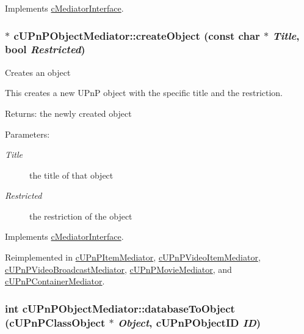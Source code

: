 Implements \hyperlink{classcMediatorInterface_cd087c690154d43ac5ef92c5a42f2349}{cMediatorInterface}.\hypertarget{classcUPnPObjectMediator_bfbca3f1cbadacee2b21306364750f26}{
\subsubsection[{createObject}]{ $\ast$ cUPnPObjectMediator::createObject (const char $\ast$ {\em Title}, \/  bool {\em Restricted})}}
\label{classcUPnPObjectMediator_bfbca3f1cbadacee2b21306364750f26}


Creates an object

This creates a new UPnP object with the specific title and the restriction.

\begin{Desc}
\item[Returns:]the newly created object \end{Desc}
\begin{Desc}
\item[Parameters:]
\begin{description}
\item[{\em Title}]the title of that object \item[{\em Restricted}]the restriction of the object \end{description}
\end{Desc}
 

Implements \hyperlink{classcMediatorInterface_68a8350f7ea5ccd2496580035228b1fc}{cMediatorInterface}.

Reimplemented in \hyperlink{classcUPnPItemMediator_e2fd4cf5e6435f1eeadd11f9a99cd2db}{cUPnPItemMediator}, \hyperlink{classcUPnPVideoItemMediator_27e001142c3651c36dfd3b7c450414c0}{cUPnPVideoItemMediator}, \hyperlink{classcUPnPVideoBroadcastMediator_14fefa90807d40d91a80712729af2beb}{cUPnPVideoBroadcastMediator}, \hyperlink{classcUPnPMovieMediator_29d40a311b7283cc4fba36860ac8c935}{cUPnPMovieMediator}, and \hyperlink{classcUPnPContainerMediator_751177c725da94b1b91f6cda4645844d}{cUPnPContainerMediator}.\hypertarget{classcUPnPObjectMediator_07a6a1d2694fb2f4573bd50374406b24}{
\subsubsection[{databaseToObject}]{\setlength{\rightskip}{0pt plus 5cm}int cUPnPObjectMediator::databaseToObject ({\bf cUPnPClassObject} $\ast$ {\em Object}, \/  {\bf cUPnPObjectID} {\em ID})}}
\label{classcUPnPObjectMediator_07a6a1d2694fb2f4573bd50374406b24}


